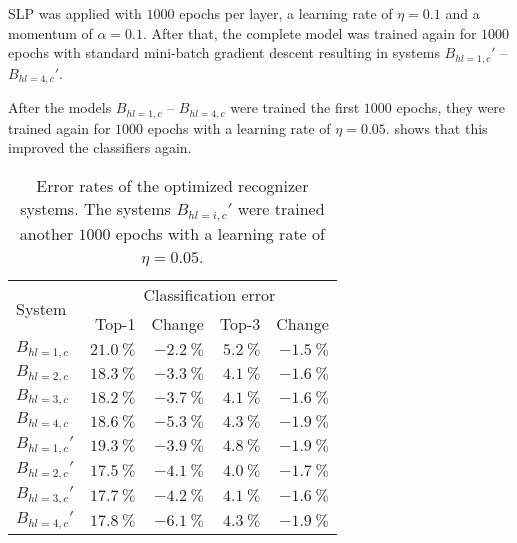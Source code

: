 \Gls{SLP} was applied with $\num{1000}$ epochs per layer, a
learning rate of $\eta=0.1$ and a momentum of $\alpha=0.1$. After that, the
complete model was trained again for $1000$ epochs with standard mini-batch
gradient descent resulting in systems $B_{hl=1,c}'$ -- $B_{hl=4,c}'$.

After the models $B_{hl=1,c}$ -- $B_{hl=4,c}$ were trained the first $1000$ epochs,
they were trained again for $\num{1000}$ epochs with a learning rate of $\eta =
0.05$.  shows that
this improved the classifiers again.

\begin{table}[htb]
    \centering
    \begin{tabular}{lrrrr}
    \toprule
    \multirow{2}{*}{System}  & \multicolumn{4}{c}{Classification error}\\
    \cmidrule(l){2-5}
              & Top-1                 & Change                & Top-3                & Change\\\midrule
    $B_{hl=1,c}$ & $\SI{21.0}{\percent}$ & $\SI{-2.2}{\percent}$ & $\SI{5.2}{\percent}$ & $\SI{-1.5}{\percent}$\\
    $B_{hl=2,c}$ & $\SI{18.3}{\percent}$ & $\SI{-3.3}{\percent}$ & $\SI{4.1}{\percent}$ & $\SI{-1.6}{\percent}$\\
    $B_{hl=3,c}$ & \underline{$\SI{18.2}{\percent}$} & $\SI{-3.7}{\percent}$ & \underline{$\SI{4.1}{\percent}$} & $\SI{-1.6}{\percent}$\\
    $B_{hl=4,c}$ & $\SI{18.6}{\percent}$ & $\SI{-5.3}{\percent}$ & $\SI{4.3}{\percent}$ & $\SI{-1.9}{\percent}$\\\midrule
    $B_{hl=1,c}'$ & $\SI{19.3}{\percent}$ & $\SI{-3.9}{\percent}$ & $\SI{4.8}{\percent}$ & $\SI{-1.9}{\percent}$ \\
    $B_{hl=2,c}'$ & \underline{$\SI{17.5}{\percent}$} & $\SI{-4.1}{\percent}$ & \underline{$\SI{4.0}{\percent}$} & $\SI{-1.7}{\percent}$\\
    $B_{hl=3,c}'$ & $\SI{17.7}{\percent}$ & $\SI{-4.2}{\percent}$ & $\SI{4.1}{\percent}$ & $\SI{-1.6}{\percent}$\\
    $B_{hl=4,c}'$ & $\SI{17.8}{\percent}$ & $\SI{-6.1}{\percent}$ & $\SI{4.3}{\percent}$ & $\SI{-1.9}{\percent}$\\
    \bottomrule
    \end{tabular}
    \caption{Error rates of the optimized recognizer systems. The systems
             $B_{hl=i,c}'$ were trained another $\num{1000}$ epochs with a learning rate
             of $\eta=0.05$.}
\label{table:complex-recognizer-systems-evaluation}
\end{table}
